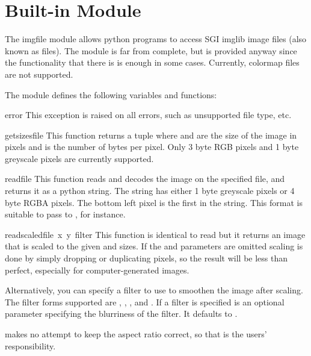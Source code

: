 \section{Built-in Module }
\label{module-imgfile}

The imgfile module allows python programs to access SGI imglib image
files (also known as  files).  The module is far from
complete, but is provided anyway since the functionality that there is
is enough in some cases.  Currently, colormap files are not supported.

The module defines the following variables and functions:

\renewcommand{\indexsubitem}{(in module imgfile)}
\begin{excdesc}{error}
This exception is raised on all errors, such as unsupported file type, etc.
\end{excdesc}

\begin{funcdesc}{getsizes}{file}
This function returns a tuple  where
 and  are the size of the image in pixels and
 is the number of
bytes per pixel. Only 3 byte RGB pixels and 1 byte greyscale pixels
are currently supported.
\end{funcdesc}

\begin{funcdesc}{read}{file}
This function reads and decodes the image on the specified file, and
returns it as a python string. The string has either 1 byte greyscale
pixels or 4 byte RGBA pixels. The bottom left pixel is the first in
the string. This format is suitable to pass to ,
for instance.
\end{funcdesc}

\begin{funcdesc}{readscaled}{file\, x\, y\, filter}
This function is identical to read but it returns an image that is
scaled to the given  and  sizes. If the  and
 parameters are omitted scaling is done by
simply dropping or duplicating pixels, so the result will be less than
perfect, especially for computer-generated images.

Alternatively, you can specify a filter to use to smoothen the image
after scaling. The filter forms supported are ,
, ,  and
. If a filter is specified  is an optional
parameter specifying the blurriness of the filter. It defaults to .

 makes no
attempt to keep the aspect ratio correct, so that is the users'
responsibility.
\end{funcdesc}

